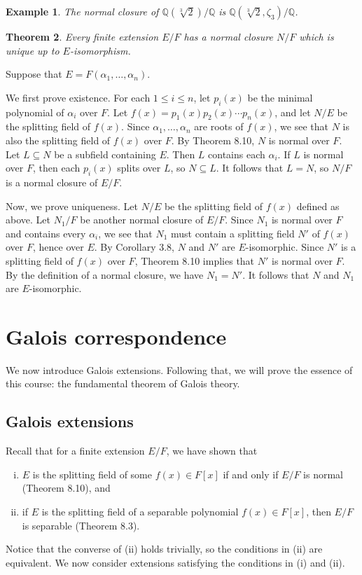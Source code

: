 \documentclass[10pt]{article}
\makeatletter
\newcommand{\Q}{\mathbb{Q}}
\theoremstyle{newstyle}
\newtheorem{thm}{Theorem}[section]
\newtheorem{exmp}[thm]{Example}
\newenvironment{pf}[1][\proofname]{\par
  \pushQED{\qed}%
  \normalfont \topsep0\p@\relax
  \trivlist
  \item[\hskip\labelsep\scshape
  #1\@addpunct{.}]\ignorespaces
}{%
  \popQED\endtrivlist\@endpefalse
}
\makeatother
\begin{document}
\begin{exmp}
The normal closure of $\Q(\sqrt[3]{2})/\Q$ is $\Q(\sqrt[3]{2}, \zeta_3)/\Q$. 
\end{exmp}

\begin{thm}
Every finite extension $E/F$ has a normal closure $N/F$ which is unique up to $E$-isomorphism. 
\end{thm}
\begin{pf}
Suppose that $E = F(\alpha_1, \dots, \alpha_n)$. 

We first prove existence. For each $1 \leq i \leq n$, let $p_i(x)$ be the minimal polynomial 
of $\alpha_i$ over $F$. Let $f(x) = p_1(x) p_2(x) \cdots p_n(x)$, and let $N/E$ 
be the splitting field of $f(x)$. Since $\alpha_1, \dots, \alpha_n$ are roots of $f(x)$, 
we see that $N$ is also the splitting field of $f(x)$ over $F$. By Theorem 8.10, $N$ is normal over $F$. 
Let $L \subseteq N$ be a subfield containing $E$. Then $L$ contains each $\alpha_i$. If 
$L$ is normal over $F$, then each $p_i(x)$ splits over $L$, so $N \subseteq L$. It follows that $L = N$, 
so $N/F$ is a normal closure of $E/F$.

Now, we prove uniqueness. Let $N/E$ be the splitting field of $f(x)$ defined as above. 
Let $N_1/F$ be another normal closure of $E/F$. Since $N_1$ is normal over $F$ and 
contains every $\alpha_i$, we see that $N_1$ must contain a splitting field $N'$ of 
$f(x)$ over $F$, hence over $E$. By Corollary 3.8, $N$ and $N'$ are $E$-isomorphic. 
Since $N'$ is a splitting field of $f(x)$ over $F$, Theorem 8.10 implies that $N'$ 
is normal over $F$. By the definition of a normal closure, we have $N_1 = N'$. 
It follows that $N$ and $N_1$ are $E$-isomorphic. 
\end{pf}

\newpage 
\section{Galois correspondence}

We now introduce Galois extensions. Following that, we will prove the essence of this course: 
the fundamental theorem of Galois theory. 

\subsection{Galois extensions}

Recall that for a finite extension $E/F$, we have shown that 
\begin{enumerate}[(i)]
    \item $E$ is the splitting field of some $f(x) \in F[x]$ if and only if $E/F$ is normal 
    (Theorem 8.10), and 
    \item if $E$ is the splitting field of a separable polynomial $f(x) \in F[x]$, then $E/F$ 
    is separable (Theorem 8.3). 
\end{enumerate}
Notice that the converse of (ii) holds trivially, so the conditions in (ii) are equivalent. 
We now consider extensions satisfying the conditions in (i) and (ii). 
\end{document}
